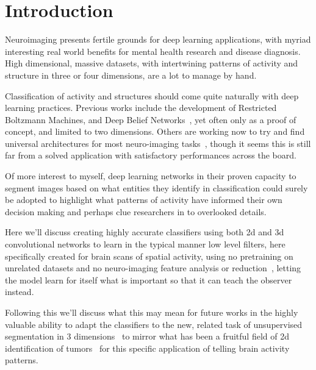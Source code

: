 \section{Introduction}\label{sec:introduction}

Neuroimaging presents fertile grounds for deep learning applications, with myriad interesting real world benefits
for mental health research and disease diagnosis.
High dimensional, massive datasets, with intertwining patterns of activity and structure in three or four
dimensions, are a lot to manage by hand.

Classification of activity and structures should come quite naturally with deep learning practices.
Previous works include the development of Restricted Boltzmann Machines, and Deep Belief Networks~\cite{plis2014deep},
yet often only as a proof of concept, and limited to two dimensions.
Others are working now to try and find universal architectures for most
neuro-imaging tasks~\cite{henschel2019fastsurfer}, though it seems this is still far from a solved
application with satisfactory performances across the board.

Of more interest to myself, deep learning networks in their proven capacity to segment images based on what entities
they identify in classification could surely be adopted to highlight what patterns of activity have informed their
own decision making and perhaps clue researchers in to overlooked details.

Here we'll discuss creating highly accurate classifiers using both 2d and 3d convolutional networks
to learn in the typical manner low level filters, here specifically created for brain scans of spatial activity, using
no pretraining on unrelated datasets and no neuro-imaging feature analysis or reduction~\cite{shi2018feature},
letting the model learn for itself what is important so that it can teach the observer instead.

Following this we'll discuss what this may mean for future works in the highly valuable ability to adapt the classifiers
to the new, related task of unsupervised segmentation in 3 dimensions~\cite{shu2016unsupervised} to mirror what has been
a fruitful field of 2d identification of tumors~\cite{akkus2017deep} for this specific application of telling brain
activity patterns.
